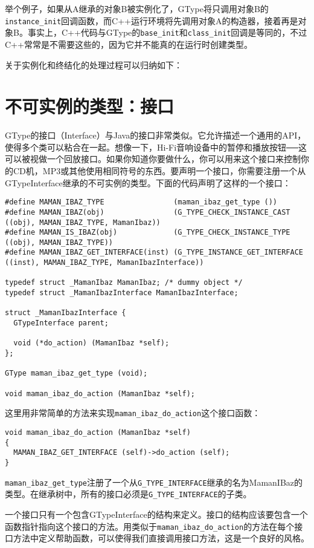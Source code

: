 举个例子，如果从A继承的对象B被实例化了，GType将只调用对象B的\verb|instance_init|回调函数，而C++运行环境将先调用对象A的构造器，接着再是对象B。事实上，C++代码与GType的\verb|base_init|和\verb|class_init|回调是等同的，不过C++常常是不需要这些的，因为它并不能真的在运行时创建类型。

关于实例化和终结化的处理过程可以归纳如下：

\section{不可实例的类型：接口}
GType的接口（Interface）与Java的接口非常类似。它允许描述一个通用的API，使得多个类可以粘合在一起。想像一下，Hi-Fi音响设备中的暂停和播放按钮──这可以被视做一个回放接口。如果你知道你要做什么，你可以用来这个接口来控制你的CD机，MP3或其他使用相同符号的东西。要声明一个接口，你需要注册一个从GTypeInterface继承的不可实例的类型。下面的代码声明了这样的一个接口：

\begin{verbatim}
#define MAMAN_IBAZ_TYPE                (maman_ibaz_get_type ())
#define MAMAN_IBAZ(obj)                (G_TYPE_CHECK_INSTANCE_CAST ((obj), MAMAN_IBAZ_TYPE, MamanIbaz))
#define MAMAN_IS_IBAZ(obj)             (G_TYPE_CHECK_INSTANCE_TYPE ((obj), MAMAN_IBAZ_TYPE))
#define MAMAN_IBAZ_GET_INTERFACE(inst) (G_TYPE_INSTANCE_GET_INTERFACE ((inst), MAMAN_IBAZ_TYPE, MamanIbazInterface))

typedef struct _MamanIbaz MamanIbaz; /* dummy object */
typedef struct _MamanIbazInterface MamanIbazInterface;

struct _MamanIbazInterface {
  GTypeInterface parent;

  void (*do_action) (MamanIbaz *self);
};

GType maman_ibaz_get_type (void);

void maman_ibaz_do_action (MamanIbaz *self);
\end{verbatim}

这里用非常简单的方法来实现\verb|maman_ibaz_do_action|这个接口函数：
\begin{verbatim}
void maman_ibaz_do_action (MamanIbaz *self)
{
  MAMAN_IBAZ_GET_INTERFACE (self)->do_action (self);
}
\end{verbatim}

\verb|maman_ibaz_get_type|注册了一个从\verb|G_TYPE_INTERFACE|继承的名为MamanIBaz的类型。在继承树中，所有的接口必须是\verb|G_TYPE_INTERFACE|的子类。

一个接口只有一个包含GTypeInterface的结构来定义。接口的结构应该要包含一个函数指针指向这个接口的方法。用类似于\verb|maman_ibaz_do_action|的方法在每个接口方法中定义帮助函数，可以使得我们直接调用接口方法，这是一个良好的风格。


